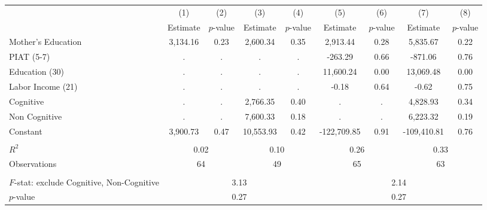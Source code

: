 \begin{tabular}{lcccccccc} \toprule
 & (1) & (2) & (3) & (4) & (5) & (6) & (7) & (8) \\
 & Estimate & $p$-value & Estimate & $p$-value  & Estimate & $p$-value  & Estimate & $p$-value  \\ \midrule 
Mother's Education &     3,134.16 &         0.23 &     2,600.34 &         0.35 &     2,913.44 &         0.28 &     5,835.67 &         0.22 \\  
PIAT (5-7) &            . &            . &            . &            . &      -263.29 &         0.66 &      -871.06 &         0.76 \\  
Education (30) &            . &            . &            . &            . &    11,600.24 &         0.00 &    13,069.48 &         0.00 \\  
Labor Income (21) &            . &            . &            . &            . &        -0.18 &         0.64 &        -0.62 &         0.75 \\  
Cognitive &            . &            . &     2,766.35 &         0.40 &            . &            . &     4,828.93 &         0.34 \\  
Non Cognitive &            . &            . &     7,600.33 &         0.18 &            . &            . &     6,223.32 &         0.19 \\  
Constant &     3,900.73 &         0.47 &    10,553.93 &         0.42 &  -122,709.85 &         0.91 &  -109,410.81 &         0.76 \\  \\ \midrule
$R^2$ &         \multicolumn{2}{c}{0.02} &          \multicolumn{2}{c}{0.10} &          \multicolumn{2}{c}{0.26} &             \multicolumn{2}{c}{0.33} \\ 
Observations &         \multicolumn{2}{c}{64} &         \multicolumn{2}{c}{49} &                \multicolumn{2}{c}{65} &       \multicolumn{2}{c}{63}  \\   \\ \midrule
$F$-stat: exclude Cognitive, Non-Cognitive &             \multicolumn{4}{c}{3.13} &              \multicolumn{4}{c}{2.14}  \\  
$p$-value &                 \multicolumn{4}{c}{0.27} &                   \multicolumn{4}{c}{0.27}  \\    \bottomrule \end{tabular}

